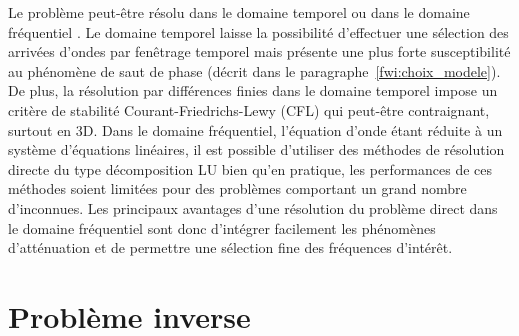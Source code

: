 Le problème peut-être résolu dans le domaine temporel ou dans le domaine fréquentiel \citep{vigh_2008}. Le domaine temporel laisse la possibilité d'effectuer une sélection des arrivées d'ondes par fenêtrage temporel mais présente une plus forte susceptibilité au phénomène de saut de phase (décrit dans le paragraphe~\ref{fwi:choix_modele}).  De plus, la résolution par différences finies dans le domaine temporel impose un critère de stabilité Courant-Friedrichs-Lewy (CFL) qui peut-être contraignant, surtout en 3D. Dans le domaine fréquentiel, l'équation d'onde étant réduite à un système d'équations linéaires, il est possible d'utiliser des méthodes de résolution directe du type décomposition LU bien qu'en pratique, les performances de ces méthodes soient limitées pour des problèmes comportant un grand nombre d'inconnues.  Les principaux avantages d'une résolution du problème direct dans le domaine fréquentiel sont donc d'intégrer facilement les phénomènes d'atténuation et de permettre une sélection fine des fréquences d'intérêt. 







\section{Problème inverse}


